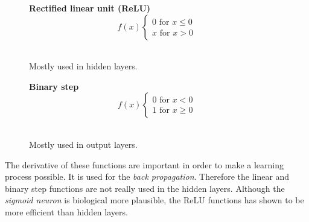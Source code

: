 \documentclass[12pt]{article}
\begin{document}
\begin{figure}[H]
\vspace{1cm}
\begin{minipage}[t]{0.5\textwidth}
\begin{center}
\textbf{Rectified linear unit (ReLU)}
\begin{equation}
f(x) \left\{\begin{matrix}
0 \text{ for } x \leq 0\\ 
x \text{ for } x >  0
\end{matrix}\right.
\end{equation}
\\
Mostly used in hidden layers.
\end{center}
\end{minipage}
\begin{minipage}[t]{0.5\textwidth}
\begin{center}
\textbf{Binary step}
\begin{equation}
f(x) \left\{\begin{matrix}
0 \text{ for } x < 0\\ 
1 \text{ for } x \geq 0
\end{matrix}\right.
\end{equation}
\\
Mostly used in output layers.
\end{center}
\end{minipage}
\end{figure}
The derivative of these functions are important in order to make a learning process possible. It is used for the \textit{back propagation}. Therefore the linear and binary step functions are not really used in the hidden layers.
Although the  \textit{sigmoid neuron} is biological more plausible, the ReLU functions has shown to be more efficient than hidden layers.\cite{advantages_activation} 
\end{document}
